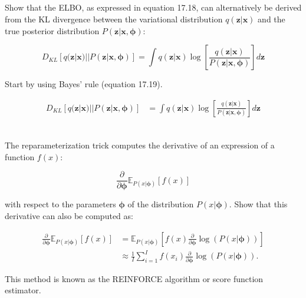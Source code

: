 \documentclass[12pt]{report}
\begin{document}
\subsection{}
\begin{mdframed}
    Show that the ELBO, as expressed in equation 17.18, can alternatively be derived from the KL divergence between the variational distribution $q(\mathbf{z}| \mathbf{x})$ and the true posterior distribution $P(\mathbf{z}|\mathbf{x}, \boldsymbol{\phi})$:

    \begin{equation*}
        D_{KL}[q(\mathbf{z}|\mathbf{x})||P(\mathbf{z}|\mathbf{x}, \boldsymbol{\phi})] = \int q(\mathbf{z}|\mathbf{x}) \log \left[ \frac{q(\mathbf{z}|\mathbf{x})}{P(\mathbf{z}|\mathbf{x}, \boldsymbol{\phi})} \right] d\mathbf{z}
        \tag{17.32}
    \end{equation*}

    Start by using Bayes' rule (equation 17.19).
\end{mdframed}

\begin{align*}
    D_{KL}[q(\mathbf{z}|\mathbf{x})||P(\mathbf{z}|\mathbf{x}, \boldsymbol{\phi})] & = \int q(\mathbf{z}|\mathbf{x}) \log \left[ \frac{q(\mathbf{z}|\mathbf{x})}{P(\mathbf{z}|\mathbf{x}, \boldsymbol{\phi})} \right] d\mathbf{z} \\
\end{align*}


\subsection{}
\begin{mdframed}
    The reparameterization trick computes the derivative of an expression of a function $f(x)$:

    \begin{equation*}
        \frac{\partial}{\partial \boldsymbol{\phi}}\mathbb{E}_{P(x|\boldsymbol{\phi})}[f(x)]
    \end{equation*}

    with respect to the parameters $\boldsymbol{\phi}$ of the distribution $P(x|\boldsymbol{\phi})$. Show that this derivative can also be computed as:

    \begin{align*}
        \frac{\partial}{\partial \boldsymbol{\phi}}\mathbb{E}_{P(x|\boldsymbol{\phi})}[f(x)] & = \mathbb{E}_{P(x|\boldsymbol{\phi})} \left[ f(x) \frac{\partial}{\partial \boldsymbol{\phi}} \log(P(x|\boldsymbol{\phi})) \right] \\
                                                                                             & \approx \frac{1}{I} \sum_{i=1}^{I} f(x_{i})\frac{\partial}{\partial \boldsymbol{\phi}} \log(P(x|\boldsymbol{\phi})).
    \end{align*}

    This method is known as the REINFORCE algorithm or score function estimator.
\end{mdframed}
\end{document}
